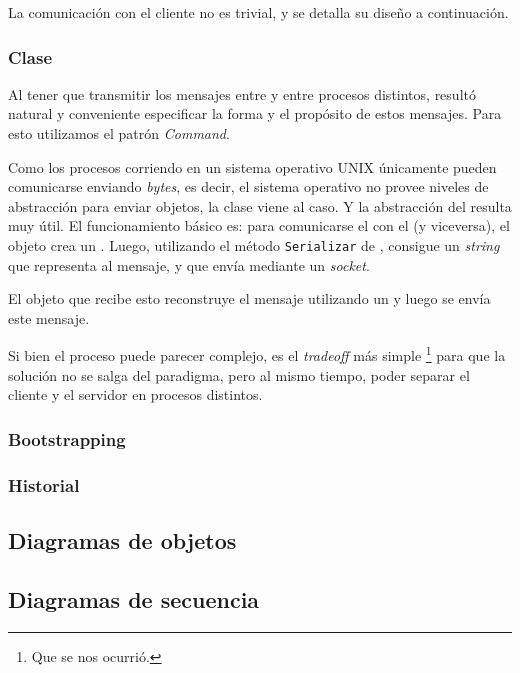           La comunicaci\'on con el cliente no es trivial, y se detalla su dise\~no a
          continuaci\'on.

      \subsubsection{Clase \mensaje{}}
          Al tener que transmitir los mensajes entre \cliente{} y \servidor{} entre
          procesos distintos, result\'o natural y conveniente especificar la forma
          y el prop\'osito de estos mensajes.
          Para esto utilizamos el patr\'on \textit{Command}.

          Como los procesos corriendo en un sistema operativo \textsc{UNIX} \'unicamente
          pueden comunicarse enviando \textit{bytes}, es decir, el sistema operativo no
          provee niveles de abstracci\'on para enviar objetos, la clase
          \constructorMensaje{} viene al caso. Y la abstracci\'on del \mensaje{}
          resulta muy \'util.
          El funcionamiento b\'asico es: para comunicarse el \cliente{} con el \servidor{}
          (y viceversa), el objeto crea un \mensaje{}.
          Luego, utilizando el m\'etodo \texttt{Serializar} de \mensaje{}, consigue un
          \textit{string} que representa al mensaje, y que env\'ia mediante un \textit{socket}.

          El objeto que recibe esto reconstruye el mensaje utilizando un \constructorMensaje{}
          y luego se env\'ia este mensaje.

          Si bien el proceso puede parecer complejo, es el \textit{tradeoff} m\'as simple
          \footnote{Que se nos ocurri\'o.} para que la soluci\'on no se salga del paradigma,
          pero al mismo tiempo, poder separar el cliente y el servidor en procesos distintos.

      \subsubsection{Bootstrapping}

      \subsubsection{Historial}

  \subsection{Diagramas de objetos}

  \subsection{Diagramas de secuencia}
